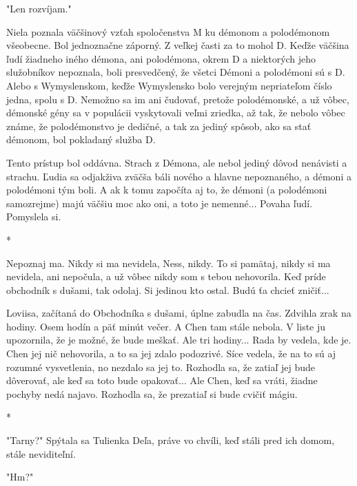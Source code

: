 \documentclass{book}
\begin{document}
"$ $Len rozvíjam."$ $ 

Niela poznala väčšinový vzťah spoločenstva M ku démonom a polodémonom všeobecne. Bol jednoznačne záporný. Z veľkej časti za to mohol D. Keďže väčšina ľudí žiadneho iného démona, ani polodémona, okrem D a niektorých jeho služobníkov nepoznala, boli presvedčený, že všetci Démoni a polodémoni sú s D. Alebo s Wymyslenskom, keďže Wymyslensko bolo verejným nepriateľom číslo jedna, spolu s D. Nemožno sa im ani čudovať, pretože polodémonské, a už vôbec, démonské gény sa v populácii vyskytovali veľmi zriedka, až tak, že nebolo vôbec známe, že polodémonstvo je dedičné, a tak za jediný spôsob, ako sa stať démonom, bol pokladaný služba D.

Tento prístup bol oddávna. Strach z Démona, ale nebol jediný dôvod nenávisti a strachu. Ľudia sa odjakživa zväčša báli nového a hlavne nepoznaného, a démoni a polodémoni tým boli. A ak k tomu započíta aj to, že démoni (a polodémoni samozrejme) majú väčšiu moc ako oni, a toto je nemenné... Povaha ľudí. Pomyslela si.

\begin{center}

*

\end{center}

Nepoznaj ma. Nikdy si ma nevidela, Ness, nikdy. To si pamätaj, nikdy si ma nevidela, ani nepočula, a už vôbec nikdy som s tebou nehovorila. Keď príde obchodník s dušami, tak odolaj. Si jedinou kto ostal. Budú ťa chcieť zničiť...

Loviisa, začítaná do Obchodníka s dušami, úplne zabudla na čas. Zdvihla zrak na hodiny. Osem hodín a päť minút večer. A Chen tam stále nebola. V liste ju upozornila, že je možné, že bude meškať. Ale tri hodiny... Rada by vedela, kde je. Chen jej nič nehovorila, a to sa jej zdalo podozrivé. Síce vedela, že na to sú aj rozumné vysvetlenia, no nezdalo sa jej to. Rozhodla sa, že zatiaľ jej bude dôverovať, ale keď sa toto bude opakovať... Ale Chen, keď sa vráti, žiadne pochyby nedá najavo. Rozhodla sa, že prezatiaľ si bude cvičiť mágiu.

\begin{center}

*

\end{center}

"$ $Tarny?"$ $  Spýtala sa Tulienka Deľa, práve vo chvíli, keď stáli pred ich domom, stále neviditeľní.

"$ $Hm?"$ $ 
\end{document}
